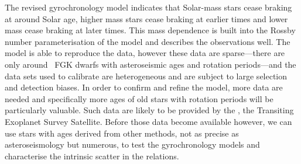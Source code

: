 The revised \citet{Vansaders2016} gyrochronology model indicates that
Solar-mass stars cease braking at around Solar age, higher mass stars cease
braking at earlier times and lower mass cease braking at later times.
This mass dependence is built into the Rossby number parameterisation of the
\citet{Vansaders2016} model and describes the observations well.
The \citet{Vansaders2016} model is able to reproduce the data, however these
data are sparse---there are only around \nastero\ FGK dwarfs with
asteroseismic ages and rotation periods---and the data sets used to calibrate
are heterogeneous and are subject to large selection and detection biases.
In order to confirm and refine the \citet{Vansaders2016} model, more data are
needed and specifically more ages of old stars with rotation periods will be
particularly valuable.
Such data are likely to be provided by the \tess, the Transiting Exoplanet
Survey Satellite.
Before those data become available however, we can use stars with ages derived
from other methods, not as precise as asteroseismology but numerous, to test
the gyrochronology models and characterise the intrinsic scatter in the
relations.
